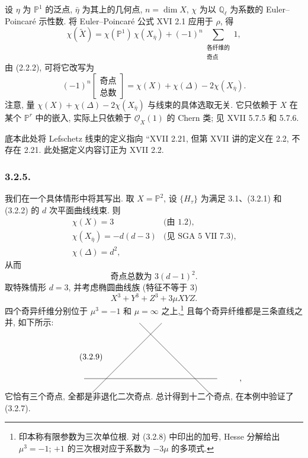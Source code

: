 设 $\eta$ 为 $\mathbb P^1$ 的泛点, $\bar\eta$ 为其上的几何点, $n=\dim X$, $\chi$ 为以 $\mathbb Q_\ell$ 为系数的 Euler--Poincar\'e 示性数. 将 Euler--Poincar\'e 公式 XVI 2.1 应用于 $\rho$, 得
\begin{equation}\tag{3.2.3}
\chi(\widetilde X)
=\chi(\mathbb P^1)\,\chi(X_{\bar\eta})
 +(-1)^n\sum_{\substack{\text{各纤维的}\\
                         \text{奇点}}}1,
\end{equation}
由 (2.2.2), 可将它改写为
\begin{equation}\tag{3.2.4}
(-1)^n
\left[\begin{array}{c}
\text{奇点}\\[3pt]
\text{总数}
\end{array}\right]
=\chi(X)+\chi(\Delta)-2\chi(X_{\bar\eta}).
\end{equation}
注意, 量 $\chi(X)+\chi(\Delta)-2\chi(X_{\bar\eta})$ 与线束的具体选取无关. 它只依赖于 $X$ 在某个 $\mathbb P^r$ 中的嵌入, 实际上只依赖于 $\underline{\mathcal O}_X(1)$ 的 Chern 类; 见 XVII 5.7.5 和 5.7.6.

\begin{editorialnote}
底本此处将 Lefschetz 线束的定义指向 ``XVII 2.21, 但第 XVII 讲的定义在 2.2, 不存在 2.21. 此处据定义内容订正为 XVII 2.2.
\end{editorialnote}

\subsubsection*{3.2.5.}
我们在一个具体情形中将其写出. 取 $X=\mathbb P^2$, 设 $\{H_\tau\}$ 为满足 3.1、(3.2.1) 和 (3.2.2) 的 $d$ 次平面曲线线束. 则
\begin{equation}\tag{3.2.6}
\begin{array}{ll}
\chi(X)=3 & \text{(由 1.2)},\\[4pt]
\chi(X_{\bar\eta})=-d(d-3) & \text{(见 SGA 5 VII 7.3)},\\[4pt]
\chi(\Delta)=d^2,&
\end{array}
\end{equation}
从而
\begin{equation}\tag{3.2.7}
\text{奇点总数为 }3(d-1)^2.
\end{equation}
取特殊情形 $d=3$, 并考虑椭圆曲线族 (特征不等于 $3$)
\begin{equation}\tag{3.2.8}
X^3+Y^3+Z^3+3\mu XYZ.
\end{equation}
四个奇异纤维分别位于 $\mu^3=-1$ 和 $\mu=\infty$ 之上,\footnote{印本称有限参数为三次单位根. 对 (3.2.8) 中印出的加号, Hesse 分解给出 $\mu^3=-1$; $+1$ 的三次根对应于系数为 $-3\mu$ 的多项式.}
且每个奇异纤维都是三条直线之并, 如下所示:
\begin{equation}\tag{3.2.9}
\begin{tikzcd}[row sep=4.5em,column sep=4.5em]
{} & {} \arrow[dl,dash,shorten <=-9mm,shorten >=-9mm]
        \arrow[dr,dash,shorten <=-9mm,shorten >=-9mm] & {} & {} \\
{} \arrow[rr,dash,shorten <=-11mm,shorten >=-11mm] & {} & {} & {,}
\end{tikzcd}
\end{equation}
它恰有三个奇点, 全都是非退化二次奇点. 总计得到十二个奇点, 在本例中验证了 (3.2.7).

